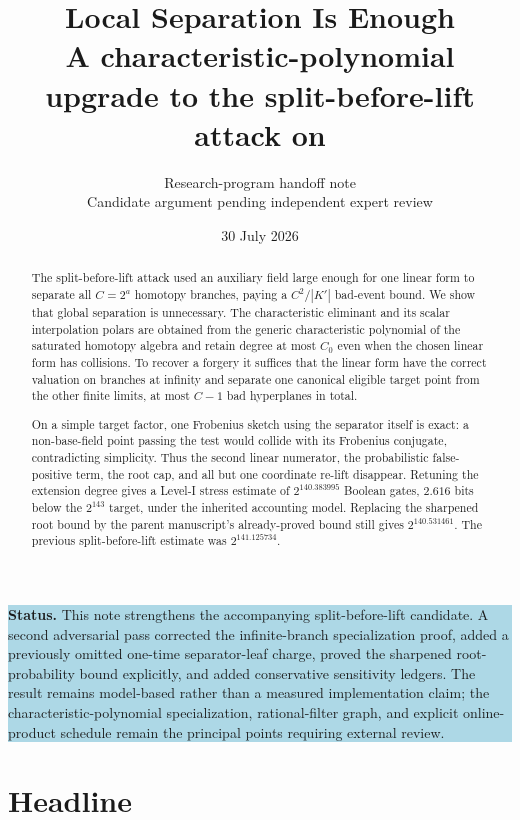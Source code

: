 \documentclass[11pt]{article}
\title{\textbf{Local Separation Is Enough}\\[0.3em]
\large A characteristic-polynomial upgrade to the split-before-lift attack on \QRUOV}
\author{Research-program handoff note\\
\small Candidate argument pending independent expert review}
\date{30 July 2026}
\theoremstyle{definition}
\begin{document}
\maketitle

\begin{center}
\colorbox{lightblue}{\parbox{0.92\textwidth}{
\textbf{Status.} This note strengthens the accompanying split-before-lift candidate.  A second adversarial pass corrected the infinite-branch specialization proof, added a previously omitted one-time separator-leaf charge, proved the sharpened root-probability bound explicitly, and added conservative sensitivity ledgers.  The result remains model-based rather than a measured implementation claim; the characteristic-polynomial specialization, rational-filter graph, and explicit online-product schedule remain the principal points requiring external review.
}}
\end{center}

\begin{abstract}
The split-before-lift attack used an auxiliary field large enough for one linear form to separate all $C=2^a$ homotopy branches, paying a $C^2/|K'|$ bad-event bound.  We show that global separation is unnecessary.  The characteristic eliminant and its scalar interpolation polars are obtained from the generic characteristic polynomial of the saturated homotopy algebra and retain degree at most $C_0$ even when the chosen linear form has collisions.  To recover a forgery it suffices that the linear form have the correct valuation on branches at infinity and separate one canonical eligible target point from the other finite limits, at most $C-1$ bad hyperplanes in total.

On a simple target factor, one Frobenius sketch using the separator itself is exact: a non-base-field point passing the test would collide with its Frobenius conjugate, contradicting simplicity.  Thus the second linear numerator, the probabilistic false-positive term, the root cap, and all but one coordinate re-lift disappear.  Retuning the extension degree gives a Level-I stress estimate of $2^{140.383995}$ Boolean gates, $2.616$ bits below the $2^{143}$ target, under the inherited accounting model.  Replacing the sharpened root bound by the parent manuscript's already-proved bound still gives $2^{140.531461}$.  The previous split-before-lift estimate was $2^{141.125734}$.
\end{abstract}

\section{Headline}
\end{document}
